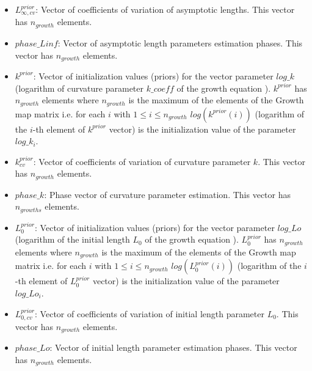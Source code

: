 \documentclass{article}
\begin{document}
\begin{itemize}
    \item $L_{\infty, cv}^{prior}$: Vector of coefficients of variation of asymptotic lengths. This vector has $n_{growth}$ elements.
    \item $phase\_Linf$: Vector of asymptotic length parameters estimation phases. This vector has $n_{growth}$ elements.
    \item $k^{prior}$: Vector of initialization values (priors) for the vector parameter $log\_k$ (logarithm of curvature parameter $k\_coeff$ of the growth equation ). $k^{prior}$ has $n_{growth}$ elements where $n_{growth}$ is the maximum of the elements of the Growth map matrix i.e. for each $i$ with $1\leq i \leq n_{growth}$ $log({k^{prior}}(i))$ (logarithm of the $i$-th element of $k^{prior}$ vector) is the initialization value of the parameter $log\_k_i$.
    \item  $k^{prior}_{cv}$: Vector of coefficients of variation of curvature parameter $k$. This vector has $n_{growth}$ elements.
    \item $phase\_k$: Phase vector of curvature parameter estimation. This vector has $n_{growths}$ elements.
    \item $L_0^{prior}$: Vector of initialization values (priors) for the vector parameter $log\_Lo$ (logarithm of the initial length $L_0$ of the growth equation ). $L_0^{prior}$ has $n_{growth}$ elements where $n_{growth}$ is the maximum of the elements of the Growth map matrix i.e. for each $i$ with $1\leq i \leq n_{growth}$ $log(L_0^{prior}(i))$ (logarithm of the $i$-th element of $L_0^{prior}$ vector) is the initialization value of the parameter $log\_Lo_i$.
     \item $L_{0,cv}^{prior}$: Vector of coefficients of variation of initial length parameter $L_0$. This vector has $n_{growth}$ elements.
    \item $phase\_Lo$: Vector of initial length parameter estimation phases. This vector has $n_{growth}$ elements.

\end{itemize}
\end{document}

